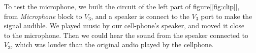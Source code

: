 To test the microphone, we built the circuit of the left part of figure[\ref{fig:clip}], from \textit{Microphone} block to $V_3$, and a speaker is connect to the $V_3$ port to make the signal audible. We played music by our cell-phone's speaker, and moved it close to the microphone. Then we could hear the sound from the speaker connected to $V_3$, which was louder than the original audio played by the cellphone.